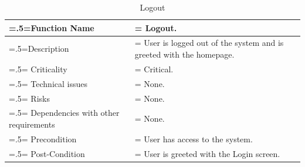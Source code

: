 \documentclass[12pt]{article}
\begin{document}
\begin{center}
    \begin{table}[H]
        \caption{Logout}
        \begin{tabularx}{\textwidth} {
                | >{\raggedright\arraybackslash\hsize=.5\hsize\linewidth=\hsize}X
                | >{\raggedright\arraybackslash\hsize=1.5\hsize\linewidth=\hsize}X |}
            \hline
            Function Name                        & Logout.                                                            \\ \hline
            Description                          & User is logged out of the system and is greeted with the homepage. \\ \hline
            Criticality                          & Critical.                                                          \\ \hline
            Technical issues                     & None.                                                              \\ \hline
            Risks                                & None.                                                              \\ \hline
            Dependencies with other requirements & None.                                                              \\ \hline
            Precondition                         & User has access to the system.                                     \\ \hline
            Post-Condition                       & User is greeted with the Login screen.                             \\ \hline
        \end{tabularx}
    \end{table}
\end{center}
\end{document}
